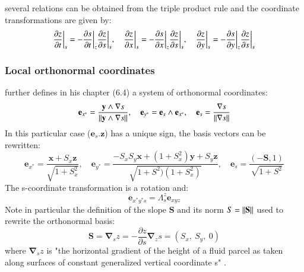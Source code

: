 several relations can be obtained from the triple product rule and the coordinate transformations are given by:
\begin{equation}
  \displaystyle
  \frac{\partial z}{\partial t}\bigg\vert_s =
  -\frac{\partial s}{\partial t}\bigg\vert_z\frac{\partial z}{\partial s}\bigg\vert_s,\quad
  \frac{\partial z}{\partial x}\bigg\vert_s =
  -\frac{\partial s}{\partial x}\bigg\vert_z\frac{\partial z}{\partial s}\bigg\vert_s,\quad
  \frac{\partial z}{\partial y}\bigg\vert_s =
  -\frac{\partial s}{\partial y}\bigg\vert_z\frac{\partial z}{\partial s}\bigg\vert_s\\
\end{equation}

\subsubsection{Local orthonormal coordinates}
\cite{griffies_fundamentals_2004} further defines in his chapter (6.4) a system of orthonormal coordinates:
\begin{equation}
  \displaystyle 
  \mathbf{e}_{x^*} =\frac{\mathbf{y}\wedge{\mathbf{\nabla}s}}
  {\left\lVert\mathbf{y}\wedge{\mathbf{\nabla}s}\right\rVert},\quad
  \mathbf{e}_{y^*} =\mathbf{e}_s\wedge{\mathbf{e}_{x^*}},\quad
  \mathbf{e}_s =\frac{\mathbf{\nabla}s}{\left\lVert\mathbf{\nabla}s\right\rVert}
\end{equation}
In this particular case ($\mathbf{e}_s.\mathbf{z}$) has a unique sign, the basis vectors can be rewritten:
\begin{equation}
  \displaystyle 
  \mathbf{e}_{x^*} =\frac{\mathbf{x}+S_x\mathbf{z}}{\sqrt{1+S_x^2}},\quad
  \mathbf{e}_{y^*} =\frac{-S_xS_y\mathbf{x}+(1+S_x^2)\mathbf{y}+S_y\mathbf{z}}{\sqrt{1+S^2)(1+S_x^2)}},\quad
  \mathbf{e}_s =\frac{(-\mathbf{S},1)}{\sqrt{1+S^2}}
\end{equation}
The s-coordinate transformation is a rotation and:
\begin{equation}
   \displaystyle
   \mathbf{e}_{x^*y^*s}=\Lambda_{s}^{z}\mathbf{e}_{xyz}
\end{equation}
Note in particular the definition of the slope $\mathbf{S}$ and its norm $S=\left\lVert\mathbf{S}\right\rVert$ used to rewrite the orthonormal basis:
\begin{equation}
   \displaystyle
   \mathbf{S}=\mathbf{\nabla}_s z=
   -\frac{\partial z}{\partial s}\mathbf{\nabla}_z s=\left( S_x,\ S_y,\ 0 \right)
\end{equation}
where $\mathbf{\nabla}_s z$ is "the horizontal gradient of the height of a fluid parcel as taken along surfaces of constant generalized vertical coordinate s" \citep{griffies_fundamentals_2004}.

